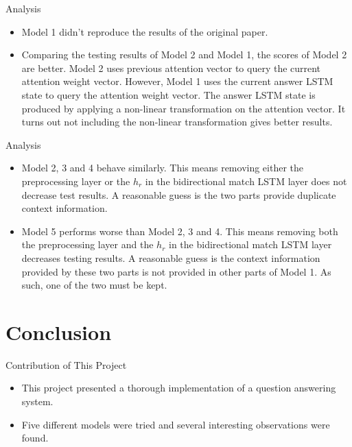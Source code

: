 \documentclass{beamer}
\begin{document}
\begin{frame}{Analysis}
    \begin{itemize}
        \item Model 1 didn't reproduce the results of the original paper.
        \item Comparing the testing results of Model 2 and Model 1, the scores of Model 2 are better.  Model 2 uses previous attention vector to query the current attention weight vector. However, Model 1 uses the current answer LSTM state to query the attention weight vector. The answer LSTM state is produced by applying a non-linear transformation on the attention vector. It turns out not including the non-linear transformation gives better results.
    \end{itemize}
\end{frame}

\begin{frame}{Analysis}
    \begin{itemize}
        \item Model 2, 3 and 4 behave similarly. This means removing either the preprocessing layer or the $h_r$ in the bidirectional match LSTM layer does not decrease test results. A reasonable guess is the two parts provide duplicate context information.

        \item Model 5 performs worse than Model 2, 3 and 4. This means removing both the preprocessing layer and the $h_r$ in the bidirectional match LSTM layer decreases testing results. A reasonable guess is the context information provided by these two parts is not provided in other parts of Model 1. As such, one of the two must be kept.
    \end{itemize}
\end{frame}

\section{Conclusion}

\begin{frame}{Contribution of This Project}
    \begin{itemize}
        \item This project presented a thorough implementation of a question answering system. \item Five different models were tried and several interesting observations were found.
    \end{itemize}

\end{frame}
\end{document}
